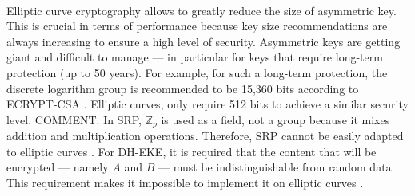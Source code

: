 ﻿\documentclass[../report.tex]{subfiles}
\begin{document}
\paragraph{} \label{sec:ecc_comparison}
Elliptic curve cryptography allows to greatly reduce the size of asymmetric key.
This is crucial in terms of performance because key size recommendations are always increasing to ensure a high level of security. Asymmetric keys are getting giant and difficult to manage --- in particular for keys that require long-term protection (up to 50 years). For example, for such a long-term protection, the discrete logarithm group is recommended to be 15,360 bits according to ECRYPT-CSA \cite{ECRYPT_Keylength}.
Elliptic curves, only require 512 bits to achieve a similar security level.
COMMENT: 
In SRP, $\mathbb{Z}_p$ is used as a field, not a group because it mixes addition and multiplication operations. Therefore, SRP cannot be easily adapted to elliptic curves \cite{CAA}. %
For DH-EKE, it is required that the content that will be encrypted --- namely $A$ and $B$ --- must be indistinguishable from random data. 
This requirement makes it impossible to implement it on elliptic curves \cite{EKE_ECC}. %
\end{document}
